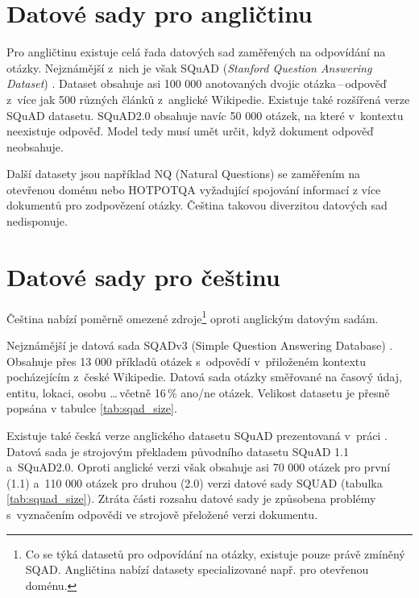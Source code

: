\section{Datové sady pro angličtinu}
Pro angličtinu existuje celá řada datových sad zaměřených na odpovídání na otázky. Nejznámější z~nich je však SQuAD (\emph{Stanford Question Answering Dataset}) \cite{squad}. Dataset obsahuje asi 100 000 anotovaných dvojic otázka\,--\,odpověď z~více jak 500 různých článků z~anglické Wikipedie. Existuje také rozšířená verze SQuAD datasetu. SQuAD2.0 \cite{squad_v2} obsahuje navíc 50 000 otázek, na které v~kontextu neexistuje odpověď. Model tedy musí umět určit, když dokument odpověď neobsahuje.\par
Další datasety jsou například NQ (Natural Questions) se zaměřením na otevřenou doménu nebo HOTPOTQA vyžadující spojování informací z více dokumentů pro zodpovězení otázky. Čeština takovou diverzitou datových sad nedisponuje.

\section{Datové sady pro češtinu}
Čeština nabízí poměrně omezené zdroje\footnote{Co se týká datasetů pro odpovídání na otázky, existuje pouze právě zmíněný SQAD. Angličtina nabízí datasety specializované např. pro otevřenou doménu.} oproti anglickým datovým sadám.\par 
Nejznámější je datová sada SQADv3 (Simple Question Answering Database) \cite{sqad}. Obsahuje přes 13 000 příkladů otázek s~odpovědí v~přiloženém kontextu pocházejícím z~české Wikipedie. Datová sada otázky směřované na časový údaj, entitu, lokaci, osobu \dots \,včetně 16\,\% ano/ne otázek. Velikost datasetu je přesně popsána v tabulce \ref{tab:sqad_size}.\par
Existuje také česká verze anglického datasetu SQuAD prezentovaná v~práci \cite{czech_squad}. Datová sada je strojovým překladem původního datasetu SQuAD 1.1 a~SQuAD2.0. Oproti anglické verzi však obsahuje asi 70 000 otázek pro první (1.1) a~110 000 otázek pro druhou (2.0) verzi datové sady SQUAD (tabulka \ref{tab:squad_size}). Ztráta části rozsahu datové sady je způsobena problémy s~vyznačením odpovědi ve strojově přeložené verzi dokumentu.

